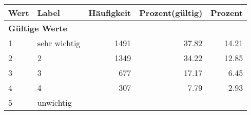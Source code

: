      \begin{longtable}{lXrrr}
     \toprule
     \textbf{Wert} & \textbf{Label} & \textbf{Häufigkeit} & \textbf{Prozent(gültig)} & \textbf{Prozent} \\
     \endhead
     \midrule
     \multicolumn{5}{l}{\textbf{Gültige Werte}}\\

     1 &
     \multicolumn{1}{X}{ sehr wichtig   } &


       \num{1491} &
       \num[round-mode=places,round-precision=2]{37,82} &
         \num[round-mode=places,round-precision=2]{14,21} \\

     2 &
     \multicolumn{1}{X}{ 2   } &


       \num{1349} &
       \num[round-mode=places,round-precision=2]{34,22} &
         \num[round-mode=places,round-precision=2]{12,85} \\

     3 &
     \multicolumn{1}{X}{ 3   } &


       \num{677} &
       \num[round-mode=places,round-precision=2]{17,17} &
         \num[round-mode=places,round-precision=2]{6,45} \\

     4 &
     \multicolumn{1}{X}{ 4   } &


       \num{307} &
       \num[round-mode=places,round-precision=2]{7,79} &
         \num[round-mode=places,round-precision=2]{2,93} \\

     5 &
     \multicolumn{1}{X}{ unwichtig   } &



\end{longtable}
